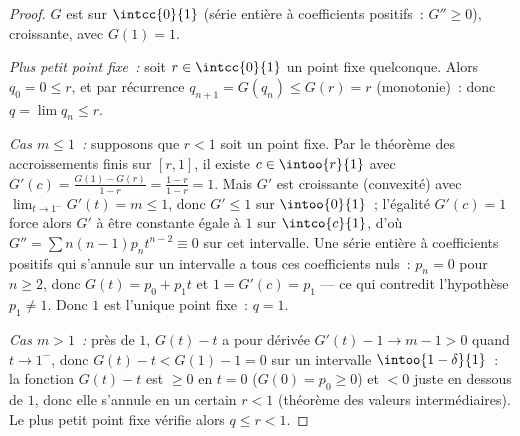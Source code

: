 \begin{proof}
$G$ est  sur $\intcc{0}{1}$ (série entière à coefficients
positifs~: $G'' \geq 0$), croissante, avec $G(1) = 1$.

\emph{Plus petit point fixe~:} soit $r \in \intcc{0}{1}$ un point
fixe quelconque. Alors $q_0 = 0 \leq r$, et par récurrence $q_{n+1} = G(q_n)
\leq G(r) = r$ (monotonie)~: donc $q = \lim q_n \leq r$.

\emph{Cas $m \leq 1$~:} supposons que $r < 1$ soit un point fixe. Par
le théorème des accroissements finis sur $[r, 1]$, il existe $c \in \intoo{r}{1}$ avec
$G'(c) = \frac{G(1) - G(r)}{1 - r} = \frac{1 - r}{1 - r} = 1$. Mais
$G'$ est croissante (convexité) avec $\lim_{t\to1^-}G'(t) = m
\leq 1$, donc $G' \leq 1$ sur $\intoo{0}{1}$~; l'égalité $G'(c) =
1$ force alors $G'$ à être constante égale à $1$ sur $\intco{c}{1}$,
d'où $G'' = \sum n(n-1)p_nt^{n-2} \equiv 0$ sur cet intervalle. Une
série entière à coefficients positifs qui s'annule sur un intervalle
a tous ces coefficients nuls~: $p_n = 0$ pour $n \geq 2$, donc $G(t) = p_0
+ p_1t$ et $1 = G'(c) = p_1$ --- ce qui contredit l'hypothèse
$p_1 \neq 1$. Donc $1$ est l'unique point fixe~: $q = 1$.

\emph{Cas $m > 1$~:} près de $1$, $G(t) - t$ a pour dérivée $G'(t) -
1 \to m - 1 > 0$ quand $t \to 1^-$, donc $G(t) - t < G(1) - 1 = 0$ sur
un intervalle $\intoo{1 - \delta}{1}$~: la fonction 
$G(t) - t$ est $\geq 0$ en $t = 0$ ($G(0) = p_0 \geq 0$) et $< 0$
juste en dessous de $1$, donc elle s'annule en un certain $r < 1$
(théorème des valeurs intermédiaires). Le plus petit point fixe
vérifie alors $q \leq r < 1$.
\end{proof}

